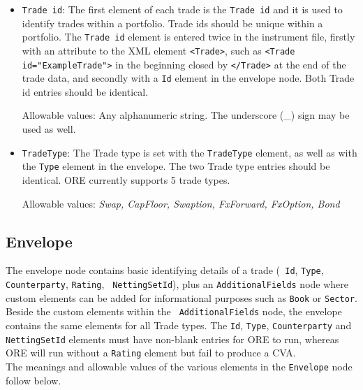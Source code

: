 \begin{itemize}
\item {\tt Trade id}: The first element of each trade is the {\tt Trade id} and it is used to identify trades within a
  portfolio. Trade ids should be unique within a portfolio.  The {\tt Trade id} element is entered twice in the
  instrument file, firstly with an attribute to the XML element {\tt <Trade>}, such as {\tt <Trade id="ExampleTrade">}
  in the beginning closed by {\tt </Trade>} at the end of the trade data, and secondly with a {\tt Id} element in the
  envelope node.  Both Trade id entries should be identical.

Allowable values:  Any alphanumeric string. The underscore (\_) sign may be used as well. 


\item {\tt TradeType}: The Trade type is set with the {\tt TradeType} element, as well as with the {\tt Type} element in
  the envelope. The two Trade type entries should be identical. ORE currently supports 5 trade types.

Allowable values:  \emph{Swap, CapFloor, Swaption, FxForward, FxOption, Bond}


\end{itemize}

\subsection{Envelope}\label{ss:envelope}
The envelope node contains basic identifying details of a trade ({\tt
  Id}, {\tt Type}, {\tt Counterparty}, {\tt Rating}, {\tt
  NettingSetId}), plus an {\tt AdditionalFields} node where custom
elements can be added for informational purposes such as {\tt Book} or
{\tt Sector}. Beside the custom elements within the {\tt
  AdditionalFields} node, the envelope contains the same elements for
all Trade types.  The {\tt Id}, {\tt Type}, {\tt Counterparty} and
{\tt NettingSetId} elements must have non-blank entries for ORE to
run, whereas ORE will run without a {\tt Rating} element but fail to
produce a CVA. \\

The meanings and allowable values of the various elements in the \lstinline!Envelope!  node follow below.


